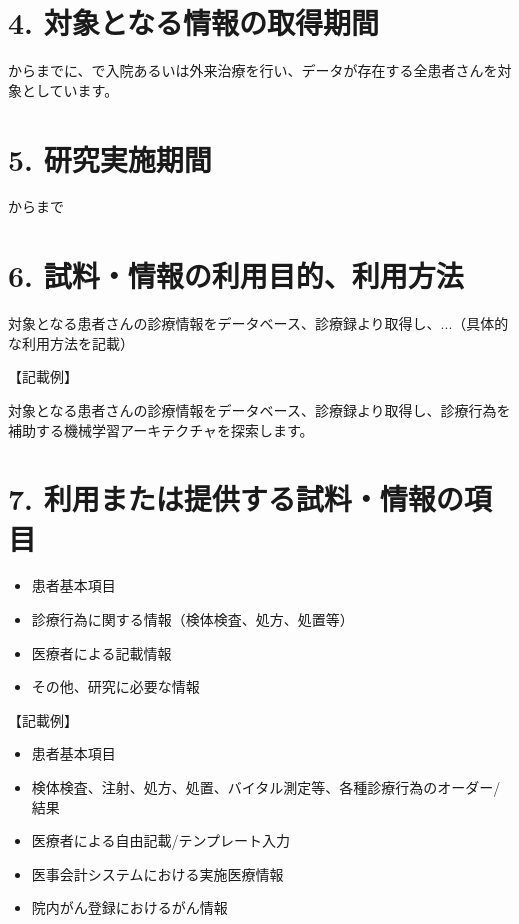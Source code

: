 \documentclass[a4paper,11pt,lualatex,ja=standard]{bxjsarticle}
\begin{document}
\section*{4. 対象となる情報の取得期間}

\DataAcquisitionStart から\DataAcquisitionEnd までに、\InstitutionName で入院あるいは外来治療を行い、データが存在する全患者さんを対象としています。

\section*{5. 研究実施期間}

\StudyStart から\StudyEnd まで

\section*{6. 試料・情報の利用目的、利用方法}

対象となる患者さんの診療情報をデータベース、診療録より取得し、...（具体的な利用方法を記載）

\vspace{1em}

\noindent
【記載例】

\noindent
対象となる患者さんの診療情報をデータベース、診療録より取得し、診療行為を補助する機械学習アーキテクチャを探索します。

\section*{7. 利用または提供する試料・情報の項目}

\begin{itemize}
\item 患者基本項目
\item 診療行為に関する情報（検体検査、処方、処置等）
\item 医療者による記載情報
\item その他、研究に必要な情報
\end{itemize}

\vspace{1em}

\noindent
【記載例】

\begin{itemize}
\item 患者基本項目
\item 検体検査、注射、処方、処置、バイタル測定等、各種診療行為のオーダー/結果
\item 医療者による自由記載/テンプレート入力
\item 医事会計システムにおける実施医療情報
\item 院内がん登録におけるがん情報
\end{itemize}
\end{document}
